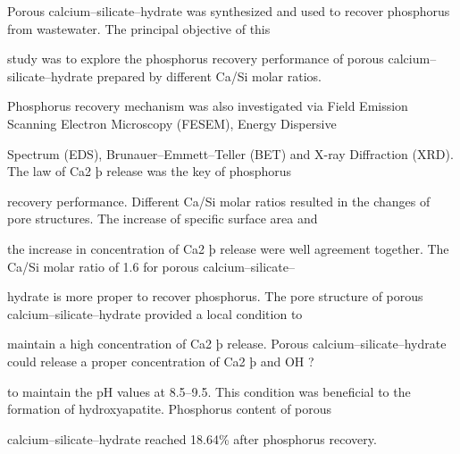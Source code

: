 \documentclass[a4paper,portrait,12pt]{article}
\begin{document}
\begin{flushleft}
Porous calcium--silicate--hydrate was synthesized and used to recover phosphorus from wastewater. The principal objective of this
\end{flushleft}


\begin{flushleft}
study was to explore the phosphorus recovery performance of porous calcium--silicate--hydrate prepared by different Ca/Si molar ratios.
\end{flushleft}


\begin{flushleft}
Phosphorus recovery mechanism was also investigated via Field Emission Scanning Electron Microscopy (FESEM), Energy Dispersive
\end{flushleft}


\begin{flushleft}
Spectrum (EDS), Brunauer--Emmett--Teller (BET) and X-ray Diffraction (XRD). The law of Ca2 þ release was the key of phosphorus
\end{flushleft}


\begin{flushleft}
recovery performance. Different Ca/Si molar ratios resulted in the changes of pore structures. The increase of speciﬁc surface area and
\end{flushleft}


\begin{flushleft}
the increase in concentration of Ca2 þ release were well agreement together. The Ca/Si molar ratio of 1.6 for porous calcium--silicate--
\end{flushleft}


\begin{flushleft}
hydrate is more proper to recover phosphorus. The pore structure of porous calcium--silicate--hydrate provided a local condition to
\end{flushleft}


\begin{flushleft}
maintain a high concentration of Ca2 þ release. Porous calcium--silicate--hydrate could release a proper concentration of Ca2 þ and OH ?
\end{flushleft}


\begin{flushleft}
to maintain the pH values at 8.5--9.5. This condition was beneﬁcial to the formation of hydroxyapatite. Phosphorus content of porous
\end{flushleft}


\begin{flushleft}
calcium--silicate--hydrate reached 18.64\% after phosphorus recovery.
\end{flushleft}
\end{document}
